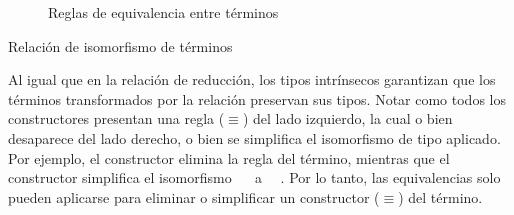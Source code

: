 \begin{figure}[H]
\iffalse
	\begin{prooftree}
		\hypo{\lambda x.t \rightleftarrows \lambda x.r}
		\infer1[$\zeta$]{ t \rightleftarrows r }
	\end{prooftree} \quad
	\begin{prooftree}
		\hypo{ts \rightleftarrows rs}
		\infer1[$\xi\textendash\cdot_1$]{ t \rightleftarrows r }
	\end{prooftree} \quad
	\begin{prooftree}
		\hypo{st \rightleftarrows sr}
		\infer1[$\xi\textendash\cdot_2$]{ t \rightleftarrows r }
	\end{prooftree} \\ \vspace{1em}
	\begin{prooftree}
		\hypo{\langle t, s \rangle \rightleftarrows \langle r, s \rangle}
		\infer1[$\xi\textendash\langle,\rangle_1$]{ t \rightleftarrows r }
	\end{prooftree} \quad
	\begin{prooftree}
		\hypo{\langle s, t \rangle \rightleftarrows \langle s, r \rangle}
		\infer1[$\xi\textendash\langle,\rangle_2$]{ t \rightleftarrows r }
	\end{prooftree} \quad
	\begin{prooftree}
		\hypo{\pi_A t \rightleftarrows \pi_A r}
		\infer1[$\xi\textendash\pi$]{ t \rightleftarrows r }
	\end{prooftree} \\ \vspace{1em}
	\begin{prooftree}
		\hypo{[iso]\!\!\equiv t \rightleftarrows [iso]\!\!\equiv r}
		\infer1[$\xi\textendash\!\!\equiv$]{ t \rightleftarrows r }
	\end{prooftree}
\fi
	
	\caption{Reglas de equivalencia entre términos}
\end{figure}

\begin{codigo}
	Relación de isomorfismo de términos
	
\end{codigo}

Al igual que en la relación de reducción, los tipos intrínsecos garantizan que los términos transformados por la relación \const{[\_]$\equiv$\_} preservan sus tipos.
Notar como todos los constructores presentan una regla ($\equiv$) del lado izquierdo, la cual o bien desaparece del lado derecho, o bien se simplifica el isomorfismo de tipo aplicado.
Por ejemplo, el constructor  elimina la regla \const{[ comm ]$\equiv$\_} del término, mientras que el constructor  simplifica el isomorfismo \const{[ cong$\Rightarrow_2$}~~\const{]$\equiv$\_} a \const{[}~~\const{]$\equiv$\_}.
Por lo tanto, las equivalencias solo pueden aplicarse para eliminar o simplificar un constructor ($\equiv$) del término.

